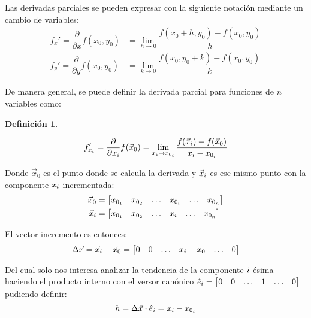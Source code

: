 \documentclass[a5paper,12pt,twoside]{book}
\newtheorem{defn}{{Definición}}[chapter]
\begin{document}
Las derivadas parciales se pueden expresar con la siguiente notación mediante un cambio de variables:
\begin{align*}
    f_x' = \dfrac{\partial}{\partial x} f(x_0,y_0) &= \lim_{h \to 0} \dfrac{f(x_0+h,y_0)-f(x_0,y_0)}{h}
    \\
    f_y' = \dfrac{\partial}{\partial y} f(x_0,y_0) &= \lim_{k \to 0} \dfrac{f(x_0,y_0+k)-f(x_0,y_0)}{k}
\end{align*}

De manera general, se puede definir la derivada parcial para funciones de $n$ variables como:

\begin{mdframed}[style=MyFrame1]
    \begin{defn}
    \end{defn}
    \begin{equation*}
        f_{x_i}'
        = \dfrac{\partial}{\partial x_i} f(\Vec{x}_0)
        = \lim_{x_i \to x_{0_i}} \dfrac{f(\Vec{x}_i)-f(\Vec{x}_0)}{x_i-x_{0_i}}
    \end{equation*}
\end{mdframed}

Donde $\Vec{x}_0$ es el punto donde se calcula la derivada y $\Vec{x}_i$ es ese mismo punto con la componente $x_i$ incrementada:
\begin{align*}
    \Vec{x}_0 &= \begin{bmatrix} x_{0_1} & x_{0_2} & \ldots & x_{0_i} & \ldots & x_{0_n} \end{bmatrix}
    \\
    \Vec{x}_i &= \begin{bmatrix} x_{0_1} & x_{0_2} & \ldots & x_i & \ldots & x_{0_n} \end{bmatrix}
\end{align*}

El vector incremento es entonces:
\begin{equation*}
    \Delta \Vec{x} = \Vec{x}_i - \Vec{x}_0 = \begin{bmatrix} 0 & 0 & \ldots & x_i - x_0 & \ldots & 0 \end{bmatrix}
\end{equation*}

Del cual solo nos interesa analizar la tendencia de la componente $i$-ésima haciendo el producto interno con el versor canónico $\hat{e}_i=\begin{bmatrix} 0 & 0 & \ldots & 1 & \ldots & 0 \end{bmatrix}$ pudiendo definir:
\begin{equation*}
    h = \Delta \Vec{x} \cdot \hat{e}_i = x_i - x_{0_i}
\end{equation*}
\end{document}
